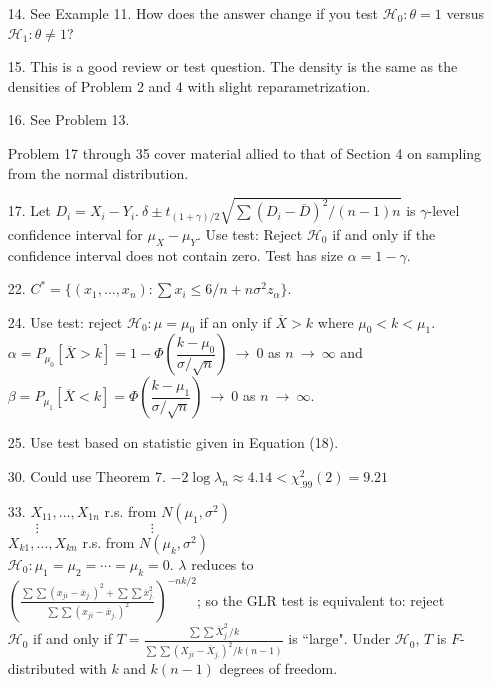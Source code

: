 \begin{enumerate}
	\item[14.] See Example 11. How does the answer change if you test $\mathscr{H}_0\colon \theta=1$ versus $\mathscr{H}_1\colon \theta\ne 1$?
	
	\item[15.] This is a good review or test question. The density is the same as the densities of Problem 2 and 4 with slight reparametrization.
	
	\item[16.] See Problem 13.
	
	Problem 17 through 35 cover material allied to that of Section 4 on sampling from the normal distribution.
	\item[17.] Let $D_i = X_i-Y_i.\ \delta \pm t_{(1+\gamma)/2}\sqrt{\sum(D_i-\overline{D})^2/(n-1)n}$ is $\gamma$-level confidence interval for $\mu_X-\mu_Y$.  Use test: Reject $\mathscr{H}_0$ if and only if the confidence interval does not contain zero. Test has size $\alpha = 1 - \gamma$.
	
	\item[22.] $C^* = \{(x_1,\ldots,x_n)\colon \sum x_i \le 6/n + n\sigma^2 z_\alpha\}$.
	
	\item[24.] Use test: reject $\mathscr{H}_0\colon \mu=\mu_0$ if an only if $\overline{X} > k$ where $\mu_0<k<\mu_1$. \\
	$\alpha = P_{\mu_0}[\overline{X}>k] = 1-\Phi\left(\dfrac{k-\mu_0}{\sigma/\sqrt{n}}\right)\ \to\ 0$ as $n\ \to\ \infty$ and $\beta = P_{\mu_1}[\overline{X}<k] = \Phi\left(\dfrac{k-\mu_1}{\sigma/\sqrt{n}}\right)\ \to\ 0$ as $n\ \to\ \infty$.
	
	\item[25.] Use test based on statistic given in Equation (18).
	
	\item[30.] Could use Theorem 7. $-2\log \lambda_n \approx 4.14 < \chi^2_{.99}(2) = 9.21$
	
	\newpage
	\item[33.] $X_{11},\ldots, X_{1n}$ r.s. from $N(\mu_1,\sigma^2)$ \\
		${}\qquad \vdots \qquad\qquad\qquad\qquad \vdots$ \\ 
		$X_{k1},\ldots, X_{kn}$ r.s. from $N(\mu_k,\sigma^2)$ \\
		$\mathscr{H}_0\colon \mu_1=\mu_2=\cdots=\mu_k=0$. $\lambda$ reduces to \\
		$\left(\frac{\sum\sum(x_{ji}-\overline{x}_{j.})^2 + \sum\sum \overline{x}_{j.}^2}{\sum\sum(x_{ji}-\overline{x}_{j.})^2}\right)^{-nk/2}$; so the GLR test is equivalent to: reject \\
		$\mathscr{H}_0$ if and only if $T = \frac{\sum\sum\overline{X}_{j.}^2/k}{\sum\sum(X_{ji}-\overline{X}_{j.})^2/k(n-1)}$ is ``large". Under $\mathscr{H}_0$, $T$ is $F$-distributed with $k$ and $k(n-1)$ degrees of freedom.
	

\end{enumerate}
